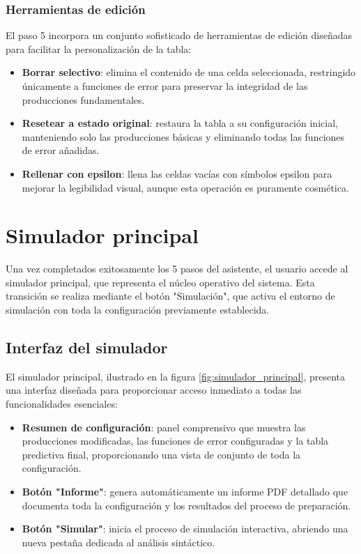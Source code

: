 \subsubsection{Herramientas de edición}

El paso 5 incorpora un conjunto sofisticado de herramientas de edición diseñadas para facilitar la personalización de la tabla:

\begin{itemize}
    \item \textbf{Borrar selectivo}: elimina el contenido de una celda seleccionada, restringido únicamente a funciones de error para preservar la integridad de las producciones fundamentales.
    \item \textbf{Resetear a estado original}: restaura la tabla a su configuración inicial, manteniendo solo las producciones básicas y eliminando todas las funciones de error añadidas.
    \item \textbf{Rellenar con epsilon}: llena las celdas vacías con símbolos epsilon para mejorar la legibilidad visual, aunque esta operación es puramente cosmética.
\end{itemize}

\section{Simulador principal}

Una vez completados exitosamente los 5 pasos del asistente, el usuario accede al simulador principal, que representa el núcleo operativo del sistema. Esta transición se realiza mediante el botón \string"Simulación\string", que activa el entorno de simulación con toda la configuración previamente establecida.

\subsection{Interfaz del simulador}

El simulador principal, ilustrado en la figura \ref{fig:simulador_principal}, presenta una interfaz diseñada para proporcionar acceso inmediato a todas las funcionalidades esenciales:

\begin{itemize}
    \item \textbf{Resumen de configuración}: panel comprensivo que muestra las producciones modificadas, las funciones de error configuradas y la tabla predictiva final, proporcionando una vista de conjunto de toda la configuración.
    \item \textbf{Botón \string"Informe\string"}: genera automáticamente un informe PDF detallado que documenta toda la configuración y los resultados del proceso de preparación.
    \item \textbf{Botón \string"Simular\string"}: inicia el proceso de simulación interactiva, abriendo una nueva pestaña dedicada al análisis sintáctico.
\end{itemize}

